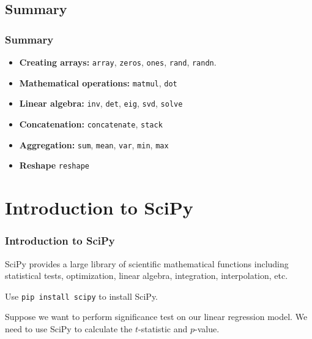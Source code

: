 \documentclass[beamer, en, version=2.0]{huangfusl-template}
\begin{document}
    \subsection{Summary}
    \begin{frame}[fragile]
        \frametitle{Summary}

        \begin{itemize}
            \item \textbf{Creating arrays:} {\color{blue}\footnotesize\verb|array|}, {\color{blue}\footnotesize\verb|zeros|}, {\color{blue}\footnotesize\verb|ones|}, {\color{blue}\footnotesize\verb|rand|}, {\color{blue}\footnotesize\verb|randn|}.
            \item \textbf{Mathematical operations:} {\color{blue}\footnotesize\verb|matmul|}, {\color{blue}\footnotesize\verb|dot|}
            \item \textbf{Linear algebra:} {\color{blue}\footnotesize\verb|inv|}, {\color{blue}\footnotesize\verb|det|}, {\color{blue}\footnotesize\verb|eig|}, {\color{blue}\footnotesize\verb|svd|}, {\color{blue}\footnotesize\verb|solve|}
            \item \textbf{Concatenation:} {\color{blue}\footnotesize\verb|concatenate|}, {\color{blue}\footnotesize\verb|stack|}
            \item \textbf{Aggregation:} {\color{blue}\footnotesize\verb|sum|}, {\color{blue}\footnotesize\verb|mean|}, {\color{blue}\footnotesize\verb|var|}, {\color{blue}\footnotesize\verb|min|}, {\color{blue}\footnotesize\verb|max|}
            \item \textbf{Reshape} {\color{blue}\footnotesize\verb|reshape|}
        \end{itemize}
    \end{frame}
    \section{Introduction to SciPy}

    \begin{frame}[fragile]
        \frametitle{Introduction to SciPy}

        SciPy provides a large library of scientific mathematical functions including statistical tests, optimization, linear algebra, integration, interpolation, etc.

        Use {\color{darkred}\footnotesize\verb|pip install scipy|} to install SciPy.

        Suppose we want to perform significance test on our linear regression model. We need to use SciPy to calculate the $t$-statistic and $p$-value.
    \end{frame}
\end{document}
